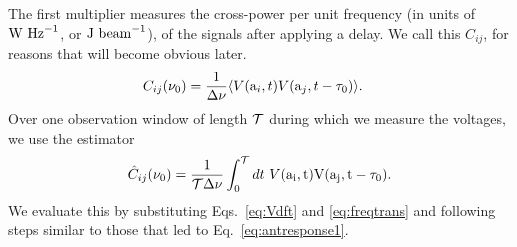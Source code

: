 \documentclass[11pt]{article}
\numberwithin{equation}{section}
\begin{document}
The first multiplier measures the cross-power per unit frequency (in units of ${\rm W} \ {\rm Hz}^{-1}$, or ${\rm J} \ {\rm beam}^{-1}$), of the signals after applying a delay. We call this $C_{ij}$, for reasons that will become obvious later.
\begin{align}
  C_{ij}(\nu_0) & = \frac{1}{\Delta \nu} \langle V({\rm a}_i, t) V({\rm a}_j, t - \tau_0) \rangle \mbox{.}
\end{align}
Over one observation window of length $\cal T$ during which we measure the voltages, we use the estimator
\begin{align}
 \hat{C}_{ij}(\nu_0) = \frac{1}{{\cal T} \Delta\nu} \int_0^{\cal T} dt \ V(\rm a_i, t) V(\rm a_j, t - \tau_0) \mbox{.} \label{eq:visibility} %
\end{align}
We evaluate this by substituting Eqs.~\eqref{eq:Vdft} and \eqref{eq:freqtrans} and following steps similar to those that led to Eq.~\eqref{eq:antresponse1}.
\end{document}
